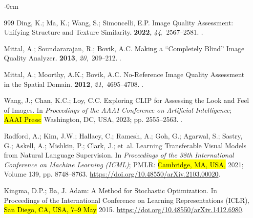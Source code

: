 \documentclass[symmetry,article,accept,pdftex,moreauthors]{Definitions/mdpi}
\begin{document}
\begin{adjustwidth}{-\extralength}{0cm}
\begin{thebibliography}{999}
Ding, K.; Ma, K.; Wang, S.; Simoncelli, E.P.
\newblock Image Quality Assessment: Unifying Structure and Texture Similarity.
  {\bf 2022}, {\em 44},~2567--2581.
.

Mittal, A.; Soundararajan, R.; Bovik, A.C.
\newblock Making a ``Completely Blind'' Image Quality Analyzer.
 {\bf 2013}, {\em 20},~209--212.
.

Mittal, A.; Moorthy, A.K.; Bovik, A.C.
\newblock No-Reference Image Quality Assessment in the Spatial Domain.
 {\bf 2012}, {\em
  21},~4695--4708.
.

Wang, J.; Chan, K.C.; Loy, C.C.
\newblock Exploring {CLIP} for Assessing the Look and Feel of Images.
\newblock In \emph{Proceedings of the AAAI Conference on Artificial Intelligence}; \hl{AAAI Press:}
  Washington, DC, USA,  2023; pp. 2555--2563.
.

Radford, A.; Kim, J.W.; Hallacy, C.; Ramesh, A.; Goh, G.; Agarwal, S.; Sastry,
  G.; Askell, A.; Mishkin, P.; Clark, J.;  et~al.
\newblock Learning Transferable Visual Models from Natural Language
  Supervision.
\newblock In \emph{Proceedings of the 38th International
  Conference on Machine Learning (ICML)}; PMLR: \hl{Cambridge, MA, USA,} 2021; Volume 139, pp. 8748--8763.
  \url{ 	
https://doi.org/10.48550/arXiv.2103.00020}.

Kingma, D.P.; Ba, J.
\newblock Adam: A Method for Stochastic Optimization.
\newblock In Proceedings of the International Conference on Learning
  Representations (ICLR),  \hl{San Diego, CA, USA, 7--9 May} 2015.
  \url{ 	
https://doi.org/10.48550/arXiv.1412.6980}.


\end{thebibliography}
\end{adjustwidth}
\end{document}
